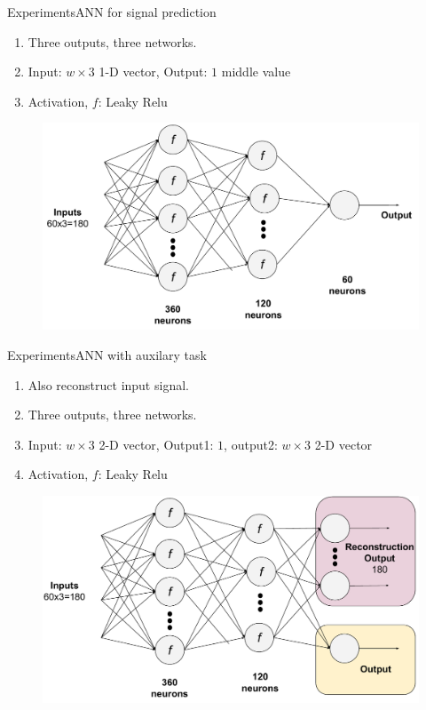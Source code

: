 \documentclass[handout]{beamer}
\begin{document}
\begin{frame}{Experiments}{ANN for signal prediction}
  \begin{enumerate}
    \item Three outputs, three networks.
    \item Input: $w\times3$ 1-D vector, Output: $1$ middle value
    \item Activation, $f$: Leaky Relu
  \end{enumerate}
  \begin{center}
    \begin{figure}
    \includegraphics[scale=0.35]{images/motor_ann_1}
    \end{figure}
  \end{center}
\end{frame}

\begin{frame}{Experiments}{ANN with auxilary task}
  \begin{enumerate}
    \item Also reconstruct input signal.
    \item Three outputs, three networks.
    \item Input: $w\times3$ 2-D vector, Output1: $1$, output2: $w\times3$ 2-D vector
    \item Activation, $f$: Leaky Relu
  \end{enumerate}
  \begin{center}
    \begin{figure}
    \includegraphics[scale=0.35]{images/motor_recon}
    \end{figure}
  \end{center}
\end{frame}
\end{document}
